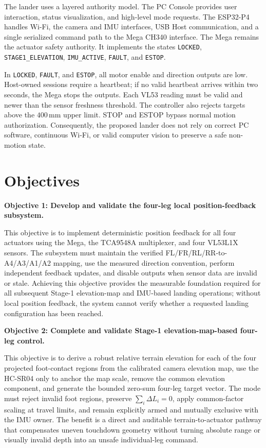 The lander uses a layered authority model. The PC Console provides user interaction, status visualization, and high-level mode requests. The ESP32-P4 handles Wi-Fi, the camera and IMU interfaces, USB Host communication, and a single serialized command path to the Mega CH340 interface. The Mega remains the actuator safety authority. It implements the states \texttt{LOCKED}, \texttt{STAGE1\_ELEVATION}, \texttt{IMU\_ACTIVE}, \texttt{FAULT}, and \texttt{ESTOP}.

In \texttt{LOCKED}, \texttt{FAULT}, and \texttt{ESTOP}, all motor enable and direction outputs are low. Host-owned sessions require a heartbeat; if no valid heartbeat arrives within two seconds, the Mega stops the outputs. Each VL53 reading must be valid and newer than the sensor freshness threshold. The controller also rejects targets above the $400\,\mathrm{mm}$ upper limit. STOP and ESTOP bypass normal motion authorization. Consequently, the proposed lander does not rely on correct PC software, continuous Wi-Fi, or valid computer vision to preserve a safe non-motion state.

\section{Objectives}

\textbf{Objective 1: Develop and validate the four-leg local position-feedback subsystem.}

This objective is to implement deterministic position feedback for all four actuators using the Mega, the TCA9548A multiplexer, and four VL53L1X sensors. The subsystem must maintain the verified FL/FR/RL/RR-to-A4/A3/A1/A2 mapping, use the measured direction convention, perform independent feedback updates, and disable outputs when sensor data are invalid or stale. Achieving this objective provides the measurable foundation required for all subsequent Stage-1 elevation-map and IMU-based landing operations; without local position feedback, the system cannot verify whether a requested landing configuration has been reached.

\textbf{Objective 2: Complete and validate Stage-1 elevation-map-based four-leg control.}

This objective is to derive a robust relative terrain elevation for each of the four projected foot-contact regions from the calibrated camera elevation map, use the HC-SR04 only to anchor the map scale, remove the common elevation component, and generate the bounded zero-sum four-leg target vector. The mode must reject invalid foot regions, preserve $\sum_i\Delta L_i=0$, apply common-factor scaling at travel limits, and remain explicitly armed and mutually exclusive with the IMU owner. The benefit is a direct and auditable terrain-to-actuator pathway that compensates uneven touchdown geometry without turning absolute range or visually invalid depth into an unsafe individual-leg command.

